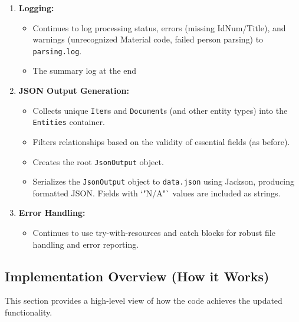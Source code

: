 \begin{enumerate}
    \item \textbf{Logging:}
        \begin{itemize}
            \item Continues to log processing status, errors (missing IdNum/Title), and warnings (unrecognized Material code, failed person parsing) to \texttt{parsing.log}.
            \item The summary log at the end
        \end{itemize}

    \item \textbf{JSON Output Generation:}
        \begin{itemize}
            \item Collects unique \texttt{Item}s and \texttt{Document}s (and other entity types) into the \texttt{Entities} container.
            \item Filters relationships based on the validity of essential fields (as before).
            \item Creates the root \texttt{JsonOutput} object.
            \item Serializes the \texttt{JsonOutput} object to \texttt{data.json} using Jackson, producing formatted JSON. Fields with `"N/A"` values are included as strings.
        \end{itemize}

    \item \textbf{Error Handling:}
        \begin{itemize}
            \item Continues to use try-with-resources and catch blocks for robust file handling and error reporting.
        \end{itemize}
\end{enumerate}

\subsection{Implementation Overview (How it Works)}
This section provides a high-level view of how the code achieves the updated functionality.

